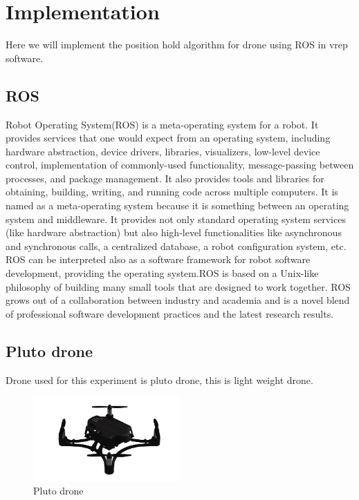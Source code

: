 \section{Implementation}
Here we will implement the position hold algorithm for drone using ROS in vrep software.
\subsection{ROS}
Robot Operating System(ROS) is a meta-operating system for a robot. It provides services that one would expect from an operating system, including hardware abstraction, device drivers, libraries, visualizers, low-level device control, implementation of commonly-used functionality, message-passing between processes, and package management. It also provides tools and libraries for obtaining, building, writing, and running code across multiple computers. It is named as a meta-operating system because it is something between an operating system and middleware. It provides not only standard operating system services (like hardware abstraction) but also high-level functionalities like asynchronous and synchronous calls, a centralized database, a robot configuration system, etc. ROS can be interpreted also as a software framework for robot software development, providing the operating system.ROS is based on a Unix-like philosophy of building many small tools that are designed to work together. ROS grows out of a collaboration between industry and academia and is a novel blend of professional software development practices and the latest research results.

\subsection{Pluto drone}
Drone used for this experiment is pluto drone, this is light weight drone.
\begin{figure}
    \centering
    \includegraphics[width=0.5\textwidth]{images/pluto.png}
    \caption{Pluto drone}
\end{figure}

